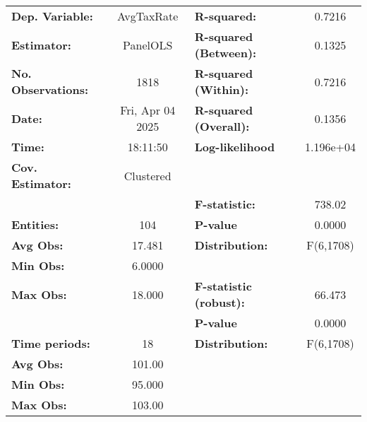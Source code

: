 \begin{center}
\begin{tabular}{lclc}
\toprule
\textbf{Dep. Variable:}              &     AvgTaxRate     & \textbf{  R-squared:         }   &      0.7216      \\
\textbf{Estimator:}                  &      PanelOLS      & \textbf{  R-squared (Between):}  &      0.1325      \\
\textbf{No. Observations:}           &        1818        & \textbf{  R-squared (Within):}   &      0.7216      \\
\textbf{Date:}                       &  Fri, Apr 04 2025  & \textbf{  R-squared (Overall):}  &      0.1356      \\
\textbf{Time:}                       &      18:11:50      & \textbf{  Log-likelihood     }   &    1.196e+04     \\
\textbf{Cov. Estimator:}             &     Clustered      & \textbf{                     }   &                  \\
\textbf{}                            &                    & \textbf{  F-statistic:       }   &      738.02      \\
\textbf{Entities:}                   &        104         & \textbf{  P-value            }   &      0.0000      \\
\textbf{Avg Obs:}                    &       17.481       & \textbf{  Distribution:      }   &    F(6,1708)     \\
\textbf{Min Obs:}                    &       6.0000       & \textbf{                     }   &                  \\
\textbf{Max Obs:}                    &       18.000       & \textbf{  F-statistic (robust):} &      66.473      \\
\textbf{}                            &                    & \textbf{  P-value            }   &      0.0000      \\
\textbf{Time periods:}               &         18         & \textbf{  Distribution:      }   &    F(6,1708)     \\
\textbf{Avg Obs:}                    &       101.00       & \textbf{                     }   &                  \\
\textbf{Min Obs:}                    &       95.000       & \textbf{                     }   &                  \\
\textbf{Max Obs:}                    &       103.00       & \textbf{                     }   &                  \\

\end{tabular}
\end{center}
